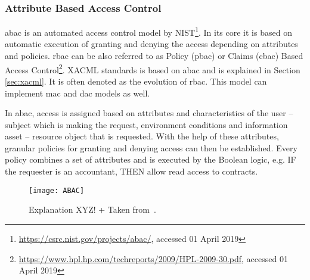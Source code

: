 \subsubsection{Attribute Based Access Control} \label{sec:sota-abac}

\acrfull{abac} is an automated access control model by NIST\footnote{\url{https://csrc.nist.gov/projects/abac/}, accessed 01 April 2019}. In its core it is based on automatic execution of granting and denying the access depending on attributes and policies. \acrshort{rbac} can be also referred to as Policy (\acrshort{pbac}) or Claims (\acrshort{cbac}) Based Access Control\footnote{\url{https://www.hpl.hp.com/techreports/2009/HPL-2009-30.pdf}, accessed 01 April 2019}. XACML standards is based on \acrshort{abac} and is explained in Section \ref{sec:xacml}. It is often denoted as the evolution of \acrshort{rbac}. This model can implement \acrshort{mac} and \acrshort{dac} models as well.

In \acrshort{abac}, access is assigned based on attributes and characteristics of the user – subject which is making the request, environment conditions and information asset – resource object that is requested. With the help of these attributes, granular policies for granting and denying access can then be established. Every policy combines a set of attributes and is executed by the Boolean logic, e.g. IF the requester is an accountant, THEN allow read access to contracts.

\begin{figure}[ht]
    \centering
    \texttt{[image: ABAC]}
    \caption{Explanation XYZ! + Taken from~\cite{AttributeABAC}.}
    \label{fig:ABAC_diagram_sota}
\end{figure}